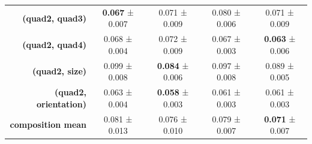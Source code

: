 \begin{tabular}{rcccc}
\textbf{(quad2, quad3)} & \textbf{0.067} ± 0.007 & 0.071 ± 0.009 & 0.080 ± 0.006 & 0.071 ± 0.009 \\
\textbf{(quad2, quad4)} & 0.068 ± 0.004 & 0.072 ± 0.009 & 0.067 ± 0.003 & \textbf{0.063} ± 0.006 \\
\textbf{(quad2, size)} & 0.099 ± 0.008 & \textbf{0.084} ± 0.006 & 0.097 ± 0.008 & 0.089 ± 0.005 \\
\textbf{(quad2, orientation)} & 0.063 ± 0.004 & \textbf{0.058} ± 0.003 & 0.061 ± 0.003 & 0.061 ± 0.003 \\
\addlinespace
\textbf{composition mean} & 0.081 ± 0.013 & 0.076 ± 0.010 & 0.079 ± 0.007 & \textbf{0.071} ± 0.007 \\
\midrule
\bottomrule
\end{tabular}